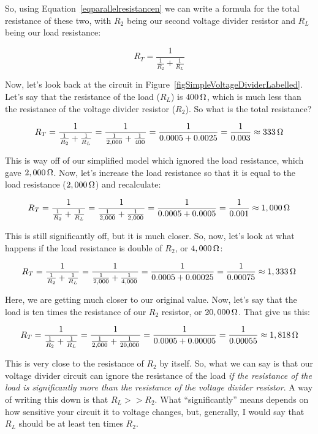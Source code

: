 So, using Equation~\ref{eqparallelresistancen} we can write a formula for the total resistance of these two, with $R_2$ being our second voltage divider resistor and $R_L$ being our load resistance:

$$ R_T = \frac{1}{\frac{1}{R_2} + \frac{1}{R_L}} $$

Now, let's look back at the circuit in Figure~\ref{figSimpleVoltageDividerLabelled}.
Let's say that the resistance of the load ($R_L$) is $400\,\si{\ohm}$, which is much less than the resistance of the voltage divider resistor ($R_2$).
So what is the total resistance?

$$ R_T = \frac{1}{\frac{1}{R_2} + \frac{1}{R_L}} = \frac{1}{\frac{1}{2,000} + \frac{1}{400}} = \frac{1}{0.0005 + 0.0025} = \frac{1}{0.003} \approx 333\,\si{\ohm} $$

This is way off of our simplified model which ignored the load resistance, which gave $2,000\,\si{\ohm}$.
Now, let's increase the load resistance so that it is equal to the load resistance ($2,000\,\si{\ohm}$) and recalculate:

$$ R_T = \frac{1}{\frac{1}{R_2} + \frac{1}{R_L}} = \frac{1}{\frac{1}{2,000} + \frac{1}{2,000}} = \frac{1}{0.0005 + 0.0005} = \frac{1}{0.001} \approx 1,000\,\si{\ohm} $$

This is still significantly off, but it is much closer.
So, now, let's look at what happens if the load resistance is double of $R_2$, or $4,000\,\si{\ohm}$:

$$ R_T = \frac{1}{\frac{1}{R_2} + \frac{1}{R_L}} = \frac{1}{\frac{1}{2,000} + \frac{1}{4,000}} = \frac{1}{0.0005 + 0.00025} = \frac{1}{0.00075} \approx 1,333\,\si{\ohm} $$

Here, we are getting much closer to our original value.  Now, let's say that the load is ten times the resistance of our $R_2$ resistor, or $20,000\,\si{\ohm}$.  That give us this:

$$ R_T = \frac{1}{\frac{1}{R_2} + \frac{1}{R_L}} = \frac{1}{\frac{1}{2,000} + \frac{1}{20,000}} = \frac{1}{0.0005 + 0.00005} = \frac{1}{0.00055} \approx 1,818\,\si{\ohm} $$

This is very close to the resistance of $R_2$ by itself.
So, what we can say is that our voltage divider circuit can ignore the resistance of the load \emph{if the resistance of the load is significantly more than the resistance of the voltage divider resistor}.
A way of writing this down is that $R_L >> R_2$.
What ``significantly'' means depends on how sensitive your circuit it to voltage changes, but, generally, I would say that $R_L$ should be at least ten times $R_2$.

